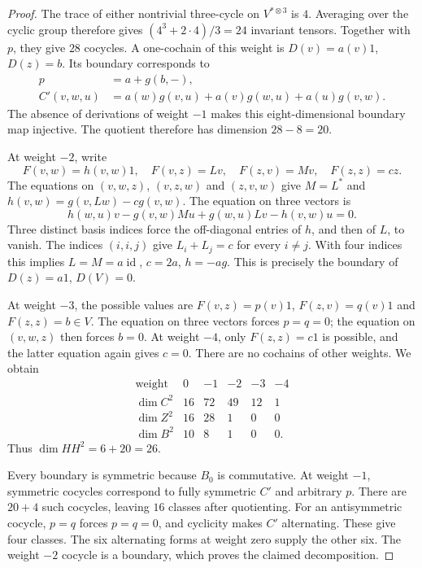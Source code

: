 \begin{proof}
The trace of either nontrivial three-cycle on
\(V^{*\otimes3}\) is \(4\). Averaging over the cyclic group
therefore gives \((4^3+2\cdot4)/3=24\) invariant tensors.
Together with \(p\), they give \(28\) cocycles.
A one-cochain of this weight is \(D(v)=a(v)1\), \(D(z)=b\).
Its boundary corresponds to
\[
 \begin{split}
 p&=a+g(b,-),\\
 C'(v,w,u)&=a(w)g(v,u)+a(v)g(w,u)+a(u)g(v,w).
 \end{split}
\]
The absence of derivations of weight \(-1\) makes this
eight-dimensional boundary map injective. The quotient
therefore has dimension \(28-8=20\).

At weight \(-2\), write
\[
 F(v,w)=h(v,w)1,\quad F(v,z)=Lv,\quad
 F(z,v)=Mv,\quad F(z,z)=cz.
\]
The equations on \((v,w,z)\), \((v,z,w)\) and \((z,v,w)\)
give \(M=L^*\) and \(h(v,w)=g(v,Lw)-cg(v,w)\).
The equation on three vectors is
\[
 h(w,u)v-g(v,w)Mu+g(w,u)Lv-h(v,w)u=0.
\]
Three distinct basis indices force the off-diagonal entries
of \(h\), and then of \(L\), to vanish.
The indices \((i,i,j)\) give \(L_i+L_j=c\) for every
\(i\ne j\). With four indices this implies
\(L=M=a\operatorname{id}\), \(c=2a\), \(h=-ag\).
This is precisely the boundary of \(D(z)=a1\), \(D(V)=0\).

At weight \(-3\), the possible values are
\(F(v,z)=p(v)1\), \(F(z,v)=q(v)1\) and \(F(z,z)=b\in V\).
The equation on three vectors forces \(p=q=0\); the equation
on \((v,w,z)\) then forces \(b=0\).
At weight \(-4\), only \(F(z,z)=c1\) is possible, and
the latter equation again gives \(c=0\).
There are no cochains of other weights. We obtain
\[
\begin{array}{c|rrrrr}
 \text{weight}&0&-1&-2&-3&-4\\\hline
 \dim C^2&16&72&49&12&1\\
 \dim Z^2&16&28&1&0&0\\
 \dim B^2&10&8&1&0&0.
\end{array}
\]
Thus \(\dim HH^2=6+20=26\).

Every boundary is symmetric because \(B_0\) is commutative.
At weight \(-1\), symmetric cocycles correspond to fully
symmetric \(C'\) and arbitrary \(p\). There are \(20+4\)
such cocycles, leaving \(16\) classes after quotienting.
For an antisymmetric cocycle, \(p=q\) forces \(p=q=0\),
and cyclicity makes \(C'\) alternating. These give four
classes. The six alternating forms at weight zero supply
the other six. The weight \(-2\) cocycle is a boundary,
which proves the claimed decomposition.
\end{proof}

